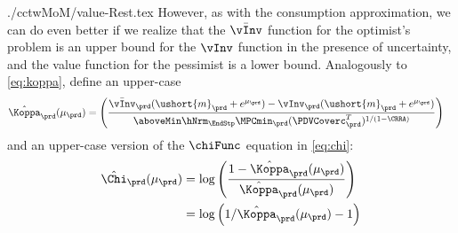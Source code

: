 \documentclass[\econtexRoot/SolvingMicroDSOPs]{subfiles}
\begin{document}
\begin{verbatimwrite}{./cctwMoM/value-Rest.tex}
  However, as with the consumption approximation, we can do even better if we
  realize that the $\bar{\vInv}$ function for the optimist's problem is
  an upper bound for the ${\vInv}$ function in the presence of uncertainty, and the value function
  for the pessimist is a lower bound. Analogously to \eqref{eq:koppa}, define an upper-case
  \begin{equation}\begin{gathered}\begin{aligned}
        \hat{\Koppa}_{\prd}(\mu_{\prd})   & = \left(\frac{\bar{\vInv}_{\prd}(\ushort{m}_{\prd}+e^{\mu_{\prd}})-\vInv_{\prd}(\ushort{m}_{\prd}+e^{\mu_{\prd}})}{\aboveMin \hNrm_{\EndStp} \MPCmin_{\prd} (\PDVCoverc_{\prd}^{T})^{1/(1-\CRRA)}}\right) \label{eq:Koppa}
      \end{aligned}\end{gathered}\end{equation}
  and an upper-case version of the $\chiFunc$ equation in \eqref{eq:chi}:
  \begin{equation}\begin{gathered}\begin{aligned}
        \hat{\Chi}_{\prd}(\mu_{\prd})  & = \log \left(\frac{1-\hat{\Koppa}_{\prd}(\mu_{\prd})}{\hat{\Koppa}_{\prd}(\mu_{\prd})}\right)
        \\  & = \log \left(1/\hat{\Koppa}_{\prd}(\mu_{\prd})-1\right) \label{eq:Chi}
      \end{aligned}\end{gathered}\end{equation}
\end{verbatimwrite}
\end{document}
